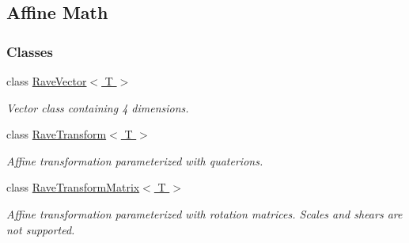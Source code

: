 \hypertarget{group__affine__math}{
\subsection{Affine Math}
\label{group__affine__math}
}
\subsubsection*{Classes}
\begin{DoxyCompactItemize}
\item 
class \hyperlink{classOpenRAVE_1_1geometry_1_1RaveVector}{RaveVector$<$ T $>$}
\begin{DoxyCompactList}\small\item\em Vector class containing 4 dimensions. \item\end{DoxyCompactList}\item 
class \hyperlink{classOpenRAVE_1_1geometry_1_1RaveTransform}{RaveTransform$<$ T $>$}
\begin{DoxyCompactList}\small\item\em Affine transformation parameterized with quaterions. \item\end{DoxyCompactList}\item 
class \hyperlink{classOpenRAVE_1_1geometry_1_1RaveTransformMatrix}{RaveTransformMatrix$<$ T $>$}
\begin{DoxyCompactList}\small\item\em Affine transformation parameterized with rotation matrices. Scales and shears are not supported. \item\end{DoxyCompactList}\end{DoxyCompactItemize}
